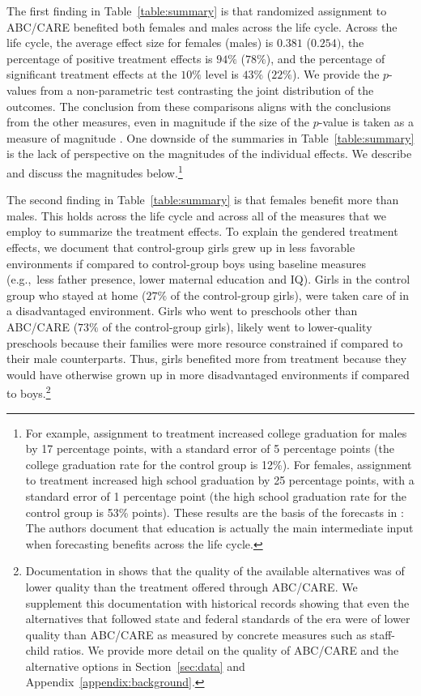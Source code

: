 The first finding in Table~\ref{table:summary} is that randomized assignment to ABC/CARE benefited both females and males across the life cycle. Across the life cycle, the average effect size for females (males) is $0.381$ ($0.254)$, the percentage of positive treatment effects is $94\%$ ($78\%$), and the percentage of significant treatment effects at the $10\%$ level is $43\%$ ($22\%$). We provide the $p$-values from a non-parametric test contrasting the joint distribution of the outcomes. The conclusion from these comparisons aligns with the conclusions from the other measures, even in magnitude if the size of the $p$-value is taken as a measure of magnitude \citep{Fisher_1935_Inference_JRSS}. One downside of the summaries in Table~\ref{table:summary} is the lack of perspective on the magnitudes of the individual effects. We describe and discuss the magnitudes below.\footnote{For example, assignment to treatment increased college graduation for males by 17 percentage points, with a standard error of 5 percentage points (the college graduation rate for the control group is 12\%). For females, assignment to treatment increased high school graduation by 25 percentage points, with a standard error of 1 percentage point (the high school graduation rate for the control group is 53\% points). These results are the basis of the forecasts in \citet{Garcia_Heckman_Leaf_etal_2017_Comp_CBA_Unpublished}: The authors document that education is actually the main intermediate input when forecasting benefits across the life cycle.}

The second finding in Table~\ref{table:summary} is that females benefit more than males. This holds across the life cycle and across all of the measures that we employ to summarize the treatment effects. To explain the gendered treatment effects, we document that control-group girls grew up in less favorable environments if compared to control-group boys using baseline measures (e.g.,\ less father presence, lower maternal education and IQ). Girls in the control group who stayed at home ($27\%$ of the control-group girls), were taken care of in a disadvantaged environment. Girls who went to preschools other than ABC/CARE ($73\%$ of the control-group girls), likely went to lower-quality preschools because their families were more resource constrained if compared to their male counterparts. Thus, girls benefited more from treatment because they would have otherwise grown up in more disadvantaged environments if compared to boys.\footnote{Documentation in \citet{Burchinal_etal_1989_CD_Daycare-Pre-K-Dev} shows that the quality of the available alternatives was of lower quality than the treatment offered through ABC/CARE. We supplement this documentation with historical records showing that even the alternatives that followed state and federal standards of the era were of lower quality than ABC/CARE as measured by concrete measures such as staff-child ratios. We provide more detail on the quality of ABC/CARE and the alternative options in Section~\ref{sec:data} and Appendix~\ref{appendix:background}.}

